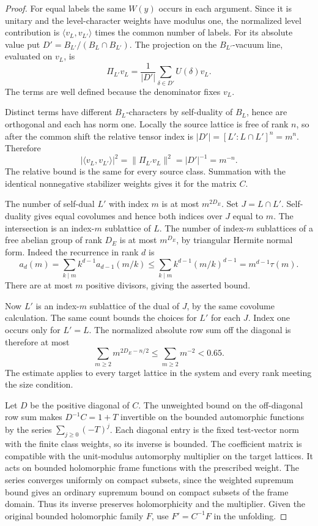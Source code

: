 \begin{proof}
For equal labels the same \(W(y)\) occurs in each argument.
Since it is unitary and the level-character weights have
modulus one, the normalized level contribution is
\(\langle v_L,v_{L'}\rangle\) times the common number of
labels. For its absolute value put
\(D'=B_{L'}/(B_L\cap B_{L'})\). The projection on the
\(B_{L'}\)-vacuum line, evaluated on \(v_L\), is
\[
      \Pi_{L'}v_L=\frac1{|D'|}\sum_{\delta\in D'}U(\delta)v_L .
\]
The terms are well defined because the denominator fixes
\(v_L\).

Distinct terms have different \(B_L\)-characters
by self-duality of \(B_L\), hence are orthogonal and each
has norm one. Locally the source lattice is free of rank
\(n\), so after the common shift the relative tensor index
is \(|D'|=[L':L\cap L']^n=m^n\). Therefore
\[
 |\langle v_L,v_{L'}\rangle|^2
   =\|\Pi_{L'}v_L\|^2=|D'|^{-1}=m^{-n}.
\]
The relative bound is the same for every source class. Summation
with the identical nonnegative stabilizer weights gives it for
the matrix \(C\).

The number of self-dual \(L'\)
with index \(m\) is at most \(m^{2D_E}\). Set
\(J=L\cap L'\). Self-duality gives equal covolumes
and hence both indices over \(J\) equal to \(m\).
The intersection is an index-\(m\) sublattice of
\(L\). The number of index-\(m\) sublattices of
a free abelian group of rank \(D_E\) is at most
\(m^{D_E}\), by triangular Hermite normal form.
Indeed the recurrence in rank \(d\) is
\[
 a_d(m)=\sum_{k\mid m}k^{d-1}a_{d-1}(m/k)\le\sum_{k\mid m}k^{d-1}(m/k)^{d-1}=m^{d-1}\tau(m).
\]
There are at most \(m\) positive divisors, giving the asserted bound.

Now \(L'\) is an index-\(m\) sublattice of the
dual of \(J\), by the same covolume calculation.
The same count bounds the choices for \(L'\) for
each \(J\). Index one occurs only for \(L'=L\).
The normalized absolute row sum off the diagonal
is therefore at most
\[
       \sum_{m\ge2} m^{2D_E-n/2}
          \le \sum_{m\ge2} m^{-2}<0.65 .
\]
The estimate applies to every target lattice in the
system and every rank meeting the size condition.

Let \(D\) be the positive diagonal of \(C\).
The unweighted bound on the off-diagonal row sum
makes \(D^{-1}C=1+T\) invertible on the bounded
automorphic functions by the series
\(\sum_{j\ge0}(-T)^j\). Each diagonal entry is
the fixed test-vector norm with the finite class
weights, so its inverse is bounded. The coefficient
matrix is compatible with the unit-modulus
automorphy multiplier on the target lattices.
It acts on bounded holomorphic frame functions
with the prescribed weight. The series converges
uniformly on compact subsets, since the weighted
supremum bound gives an ordinary supremum bound
on compact subsets of the frame domain. Thus its
inverse preserves holomorphicity and the multiplier.
Given the original bounded holomorphic family
\(F\), use \(F'=C^{-1}F\) in the unfolding.
\end{proof}

